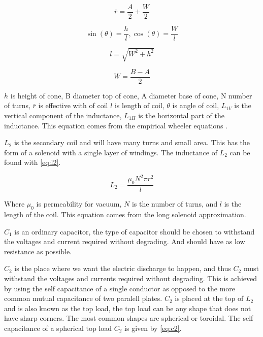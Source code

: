 \begin{equation} \label{eq:l1_3}
    \bar{r} = \frac{A}{2} + \frac{W}{2}
\end{equation}

\begin{equation} \label{eq:l1_4}
    \sin (\theta) = \frac{h}{l}, \cos (\theta) = \frac{W}{l}
\end{equation}

\begin{equation} \label{eq:l1_5}
    l = \sqrt{W^2 + h^2}
\end{equation}

\begin{equation} \label{eq:l1_6}
    W = \frac{B - A}{2}
\end{equation}


$h$ is height of cone, B diameter top of cone, A diameter base of cone, N number of turns, $\bar{r}$ is effective with of coil $l$ is length of coil, $\theta$ is angle of coil, $L_{1V}$ is the vertical component of the inductance, $L_{1H}$ is the horizontal part of the inductance. This equation comes from the empirical wheeler equations \citep{wheeler}.

$L_2$ is the secondary coil and will have many turns and small area. This has the form of a solenoid with a single layer of windings. The inductance of $L_2$ can be found with \cref{eq:l2}.

\begin{equation} \label{eq:l2}
    L_2 = \frac{{\mu}_0 N^2 \pi {r}^2}{l}
\end{equation}

Where ${\mu}_0$ is permeability for vacuum, $N$ is the number of turns, and $l$ is the length of the coil. This equation comes from the long solenoid approximation.

$C_1$ is an ordinary capacitor, the type of capacitor should be chosen to withstand the voltages and current required without degrading. And should have as low resistance as possible.

$C_2$ is the place where we want the electric discharge to happen, and thus $C_2$ must withstand the voltages and currents required without degrading. This is achieved by using the self capacitance of a single conductor as opposed to the more common mutual capacitance of two paralell plates. $C_2$ is placed at the top of $L_2$ and is also known as the top load, the top load can be any shape that does not have sharp corners. The most common shapes are spherical or toroidal. The self capacitance of a spherical top load $C_2$ is given by \cref{eq:c2}.

